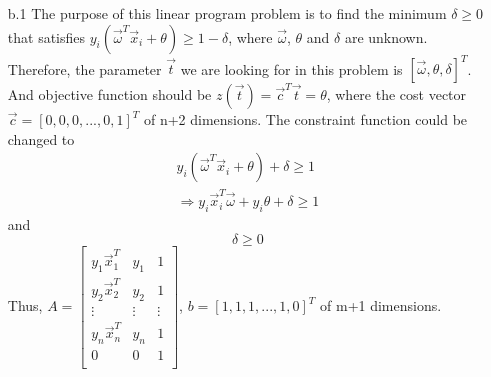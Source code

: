 \begin{enumerate}
\begin{enumerate}
	\item[b.1]
	The purpose of this linear program problem is to find the minimum $\delta \geq 0$ that satisfies $y_i(\vec{\omega}^T\vec{x}_i + \theta) \geq 1-\delta$, where $\vec{\omega}$, $\theta$ and $\delta$ are unknown. Therefore, the parameter $\vec{t}$ we are looking for  in this problem is $[\vec{\omega}, \theta, \delta]^T$. And objective function should be $z(\vec{t}) = \vec{c}^T\vec{t} = \theta$, where the cost vector $\vec{c} = [0, 0, 0, ... , 0, 1]^T$ of n+2 dimensions. The constraint function could be changed to 
	\begin{equation*}
	\begin{split}
	y_i(\vec{\omega}^T\vec{x}_i + \theta) + \delta \geq 1\\
	\Rightarrow y_i\vec{x}_i^T\vec{\omega} + y_i\theta + \delta \geq 1
	\end{split}
	\end{equation*}
	and
	\begin{equation*}
	\delta \geq 0
	\end{equation*}
	Thus, $A =
	\begin{bmatrix}
	y_1\vec{x}_1^T & y_1     & 1        \\
	y_2\vec{x}_2^T & y_2     & 1        \\
	\vdots                & \vdots & \vdots \\
	y_n\vec{x}_n^T & y_n     & 1         \\
	0                        & 0        & 1         \\
	\end{bmatrix}$,
	$b = [1, 1, 1, ... , 1, 0]^T$ of m+1 dimensions. \\
	

\end{enumerate}
\end{enumerate}
